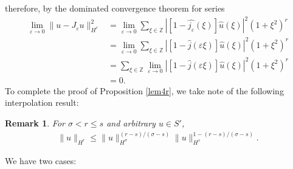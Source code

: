 \documentclass[12pt,reqno]{amsart}
\newcommand{\zz}{\mathbb{Z}}
\newcommand{\ee}{\varepsilon}
\theoremstyle{plain}  %
\newtheorem{remark}{Remark}
\theoremstyle{definition}
\begin{document}
therefore, by the dominated convergence theorem for series
\begin{equation}
	\label{o1}
	\begin{split}
		\lim_{\ee \to 0} \|u - J_\ee u \|_{H^r }^2 
		& = \lim_{\ee \to 0} \sum_{\xi \in \zz} |[1-\widehat{j_\ee}(\xi)]
		\widehat{u}(\xi) |^2 (1 + \xi^2)^r
		\\
		& = \lim_{\ee \to 0} \sum_{\xi \in \zz} |[1-\widehat{j}(\ee \xi)]
		\widehat{u}(\xi) |^2 (1 + \xi^2)^r
		\\
		& = \sum_{\xi \in \zz} \lim_{\ee \to 0} |[1-\widehat{j}(\ee \xi)]
		\widehat{u}(\xi) |^2 (1 + \xi^2)^r
		\\
		& = 0.
	\end{split}
\end{equation}
To complete the proof of Proposition \ref{lem4r}, we take note of the following interpolation result:
\begin{remark}
	\label{lem2r}
	For $\sigma < r \le s$ and arbitrary $u \in {S'}$,
	\begin{equation}
		\begin{split}
			\|u\|_{H^{r}} \le
			\|u\|_{H^\sigma}^{(r-s)/(\sigma -s)}
			\|u\|_{H^s}^{1 - (r-s)/(\sigma -s)}.
			\label{16u}
		\end{split}
	\end{equation}
\end{remark}
%
%
%
%
We have two cases:
\end{document}
